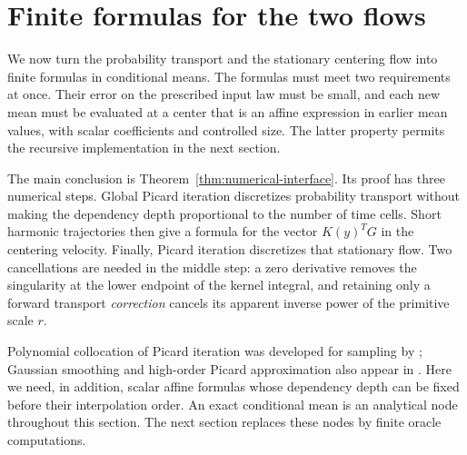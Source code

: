 \section{Finite formulas for the two flows}\label{sec:numerics}

We now turn the probability transport and the stationary centering flow
into finite formulas in conditional means.  The formulas must meet two
requirements at once.  Their error on the prescribed input law must be
small, and each new mean must be evaluated at a center that is an affine
expression in earlier mean values, with scalar coefficients and controlled
size.  The latter property permits the recursive implementation in the
next section.

The main conclusion is Theorem~\ref{thm:numerical-interface}.  Its proof
has three numerical steps.  Global Picard iteration discretizes
probability transport without making the dependency depth proportional
to the number of time cells.  Short harmonic trajectories then give a
formula for the vector $K(y)^TG$ in the centering velocity.  Finally,
Picard iteration discretizes that stationary flow.  Two cancellations
are needed in the middle step: a zero derivative removes the singularity
at the lower endpoint of the kernel integral, and retaining only a
forward transport \emph{correction} cancels its apparent inverse power
of the primitive scale $r$.

Polynomial collocation of Picard iteration was developed for sampling
by \citet[Algorithm~2 and Theorem~2.3]{lee2018odes}; Gaussian smoothing
and high-order Picard approximation also appear in
\citet[Appendix~E, Algorithm~E.1 and Theorem~E.2]{chen2026picard}.
Here we need, in addition, scalar affine formulas whose dependency depth
can be fixed before their interpolation order.  An exact conditional
mean is an analytical node throughout this section.  The next section
replaces these nodes by finite oracle computations.

